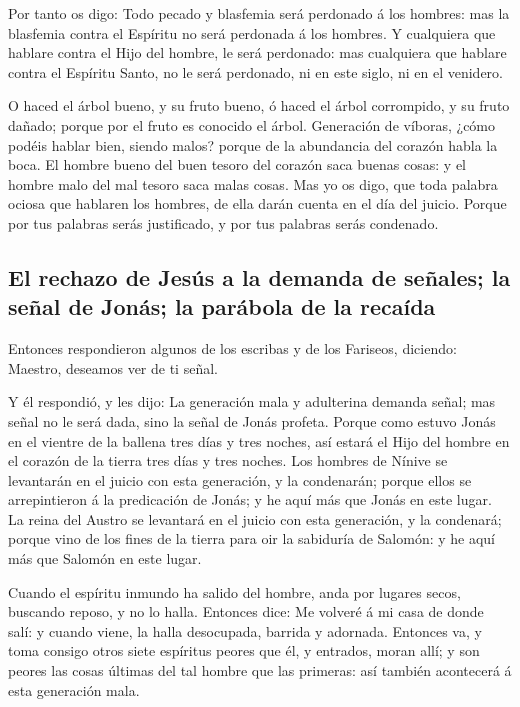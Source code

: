  Por tanto os digo: Todo pecado y blasfemia será perdonado
á los hombres: mas la blasfemia contra el Espíritu no será perdonada á
los hombres.  Y cualquiera que hablare contra el Hijo del
hombre, le será perdonado: mas cualquiera que hablare contra el Espíritu
Santo, no le será perdonado, ni en este siglo, ni en el venidero.

 O haced el árbol bueno, y su fruto bueno, ó haced el árbol
corrompido, y su fruto dañado; porque por el fruto es conocido el árbol.
 Generación de víboras, ¿cómo podéis hablar bien, siendo
malos? porque de la abundancia del corazón habla la boca. 
El hombre bueno del buen tesoro del corazón saca buenas cosas: y el
hombre malo del mal tesoro saca malas cosas.  Mas yo os
digo, que toda palabra ociosa que hablaren los hombres, de ella darán
cuenta en el día del juicio.  Porque por tus palabras serás
justificado, y por tus palabras serás condenado.

\hypertarget{el-rechazo-de-jesuxfas-a-la-demanda-de-seuxf1ales-la-seuxf1al-de-jonuxe1s-la-paruxe1bola-de-la-recauxedda}{%
\subsection{El rechazo de Jesús a la demanda de señales; la señal de
Jonás; la parábola de la
recaída}\label{el-rechazo-de-jesuxfas-a-la-demanda-de-seuxf1ales-la-seuxf1al-de-jonuxe1s-la-paruxe1bola-de-la-recauxedda}}

 Entonces respondieron algunos de los escribas y de los
Fariseos, diciendo: Maestro, deseamos ver de ti señal.

 Y él respondió, y les dijo: La generación mala y
adulterina demanda señal; mas señal no le será dada, sino la señal de
Jonás profeta.  Porque como estuvo Jonás en el vientre de
la ballena tres días y tres noches, así estará el Hijo del hombre en el
corazón de la tierra tres días y tres noches.  Los hombres
de Nínive se levantarán en el juicio con esta generación, y la
condenarán; porque ellos se arrepintieron á la predicación de Jonás; y
he aquí más que Jonás en este lugar.  La reina del Austro
se levantará en el juicio con esta generación, y la condenará; porque
vino de los fines de la tierra para oir la sabiduría de Salomón: y he
aquí más que Salomón en este lugar.

 Cuando el espíritu inmundo ha salido del hombre, anda por
lugares secos, buscando reposo, y no lo halla.  Entonces
dice: Me volveré á mi casa de donde salí: y cuando viene, la halla
desocupada, barrida y adornada.  Entonces va, y toma
consigo otros siete espíritus peores que él, y entrados, moran allí; y
son peores las cosas últimas del tal hombre que las primeras: así
también acontecerá á esta generación mala.

